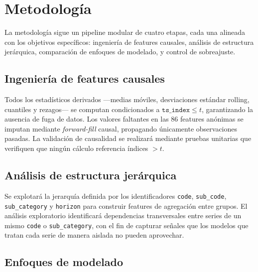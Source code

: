 \documentclass{article}
\begin{document}

\section{Metodología}
\label{sec:metodologia}

La metodología sigue un pipeline modular de cuatro etapas, cada una alineada con los objetivos específicos: ingeniería de features causales, análisis de estructura jerárquica, comparación de enfoques de modelado, y control de sobreajuste.

\subsection{Ingeniería de features causales}

Todos los estadísticos derivados —medias móviles, desviaciones estándar rolling, cuantiles y rezagos— se computan condicionados a $\texttt{ts\_index} \leq t$, garantizando la ausencia de fuga de datos. Los valores faltantes en las 86 features anónimas se imputan mediante \emph{forward-fill} causal, propagando únicamente observaciones pasadas. La validación de causalidad se realizará mediante pruebas unitarias que verifiquen que ningún cálculo referencia índices $> t$.

\subsection{Análisis de estructura jerárquica}

Se explotará la jerarquía definida por los identificadores \texttt{code}, \texttt{sub\_code}, \texttt{sub\_category} y \texttt{horizon} para construir features de agregación entre grupos. El análisis exploratorio identificará dependencias transversales entre series de un mismo \texttt{code} o \texttt{sub\_category}, con el fin de capturar señales que los modelos que tratan cada serie de manera aislada no pueden aprovechar.

\subsection{Enfoques de modelado}
\end{document}
